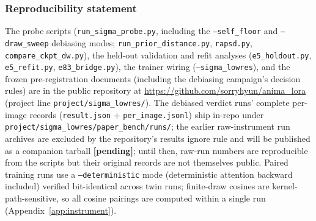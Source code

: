 \subsubsection*{Reproducibility statement}
The probe scripts (\texttt{run\_sigma\_probe.py}, including the
\texttt{--self\_floor} and \texttt{--draw\_sweep} debiasing modes;
\texttt{run\_prior\_distance.py}, \texttt{rapsd.py},
\texttt{compare\_ckpt\_dw.py}), the held-out validation and refit
analyses (\texttt{e5\_holdout.py}, \texttt{e5\_refit.py},
\texttt{e83\_bridge.py}), the trainer
wiring (\texttt{--sigma\_lowres}), and the frozen pre-registration
documents (including the debiasing campaign's decision rules) are in
the public repository at
\url{https://github.com/sorryhyun/anima_lora} (project line
\texttt{project/sigma\_lowres/}). The debiased verdict runs' complete
per-image records (\texttt{result.json} + \texttt{per\_image.jsonl})
ship in-repo under \texttt{project/sigma\_lowres/paper\_bench/runs/};
the earlier raw-instrument run archives are excluded by the repository's
results ignore rule and will be published as a companion tarball
\textbf{[pending]}; until then, raw-run numbers are reproducible from
the scripts but their original records are not themselves public.
Paired training runs use a
\texttt{--deterministic} mode (deterministic attention backward included)
verified bit-identical across twin runs; finite-draw cosines are
kernel-path-sensitive, so all cosine pairings are computed within a
single run (Appendix~\ref{app:instrument}).

